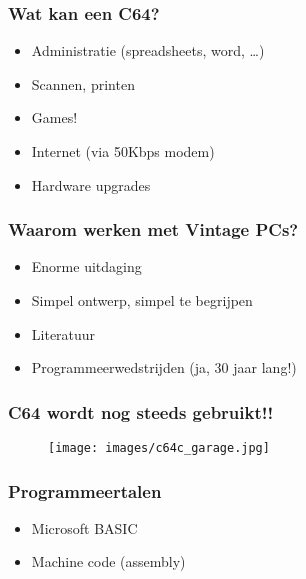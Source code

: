 \documentclass[aspectratio=43]{uva-inf-presentation}
\begin{document}

\begin{frame}
\frametitle{Wat kan een C64?}

\begin{itemize}
\item Administratie (spreadsheets, word, \dots)
\item Scannen, printen
\item Games!
\item Internet (via 50Kbps modem)
\item Hardware upgrades
\end{itemize}

\end{frame}


\begin{frame}
\frametitle{Waarom werken met Vintage PCs?}

\begin{itemize}
\item Enorme uitdaging
\item Simpel ontwerp, simpel te begrijpen
\item Literatuur
\item Programmeerwedstrijden (ja, 30 jaar lang!)
\end{itemize}

\end{frame}


\begin{frame}
\frametitle{C64 wordt nog steeds gebruikt!!}

\begin{figure}
\texttt{[image: images/c64c\_garage.jpg]}
\end{figure}

\end{frame}


\begin{frame}
\frametitle{Programmeertalen}

\begin{itemize}
\item Microsoft BASIC
\item Machine code (assembly)
\end{itemize}

\end{frame}
\end{document}
